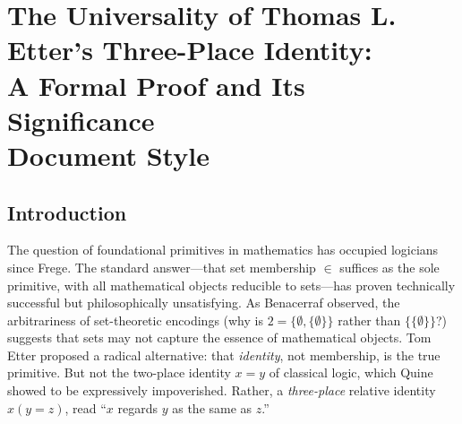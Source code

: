 \documentclass{ws-rv9x6}
\theoremstyle{remark}
\begin{document}
\chapter[The Universality of Thomas L. Etter's Three-Place Identity]{The Universality of Thomas L. Etter's Three-Place Identity:\\A Formal Proof and Its Significance\\ Document Style\label{ra_ch1}}



\begin{abstract}
    We present a formal proof, mechanized in Lean 4, demonstrating that three-place relative identity\cite{quine} is expressively adequate for mathematics. Given any model of ZFC, we construct definitional bridges showing that membership can be derived from relative identity and vice versa, with the derived membership extensionally equivalent to the original. $Id(x,y,z):= Quine \mathrm{Id}(x,y,z)$ primitive, $y \in x \;:=\; \neg\,\mathrm{Id}(x,y,x)$,
$x = y \;:=\; (\forall z,\, z \in x \leftrightarrow z \in y) \land (\forall w,\, x \in w \leftrightarrow y \in w)$.
    This establishes that ZFC can be faithfully reformulated using relative identity as the sole primitive relation. We discuss the philosophical significance of this result for foundations of mathematics.
\end{abstract}

\section{Introduction}

The question of foundational primitives in mathematics has occupied logicians since Frege. The standard answer---that set membership $\in$ suffices as the sole primitive, with all mathematical objects reducible to sets---has proven technically successful but philosophically unsatisfying. As Benacerraf\cite{benacerraf} observed, the arbitrariness of set-theoretic encodings (why is $2 = \{\emptyset, \{\emptyset\}\}$ rather than $\{\{\emptyset\}\}$?) suggests that sets may not capture the essence of mathematical objects. Tom Etter\cite{etter_eq,etter_notes,etter_mem,etter_3pl} proposed a radical alternative: that \emph{identity}, not membership, is the true primitive. But not the two-place identity $x = y$ of classical logic, which Quine showed to be expressively impoverished. Rather, a \emph{three-place} relative identity $x(y = z)$, read ``$x$ regards $y$ as the same as $z$.''
\end{document}
